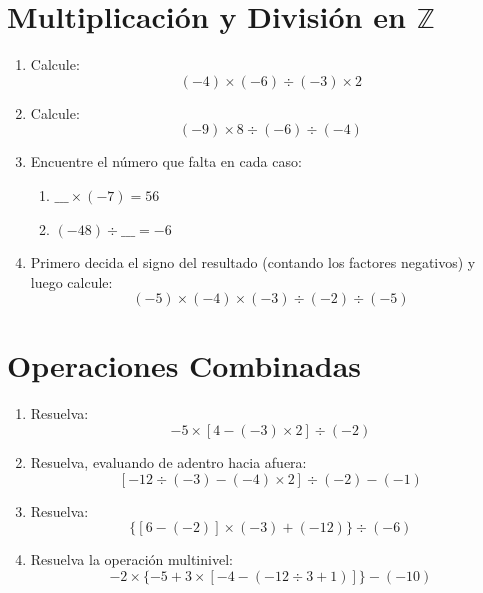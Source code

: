 \documentclass[12pt, letterpaper]{article}
\newcommand{\Z}{\mathbb{Z}}
\begin{document}
\newpage

\section{Multiplicación y División en $\Z$}

\begin{enumerate}[leftmargin=*]
  \item Calcule:
        \[
          (-4) \times (-6) \div (-3) \times 2
        \]

  \item Calcule:
        \[
          (-9) \times 8 \div (-6) \div (-4)
        \]

  \item Encuentre el número que falta en cada caso:
        \begin{enumerate}[label=\alph*)]
          \item $\_\_\_ \times (-7) = 56$
          \item $(-48) \div \_\_\_ = -6$
        \end{enumerate}

  \item Primero decida el signo del resultado (contando los factores negativos) y luego calcule:
        \[
          (-5) \times (-4) \times (-3) \div (-2) \div (-5)
        \]
\end{enumerate}

\newpage

\section{Operaciones Combinadas}

\begin{enumerate}[leftmargin=*]
  \item Resuelva:
        \[
          -5 \times [4 - (-3) \times 2] \div (-2)
        \]

  \item Resuelva, evaluando de adentro hacia afuera:
        \[
          [-12 \div (-3) - (-4) \times 2] \div (-2) - (-1)
        \]

  \item Resuelva:
        \[
          \{[6 - (-2)] \times (-3) + (-12)\} \div (-6)
        \]

  \item Resuelva la operación multinivel:
        \[
          -2 \times \{-5 + 3 \times [-4 - (-12 \div 3 + 1)]\} - (-10)
        \]
\end{enumerate}
\end{document}

